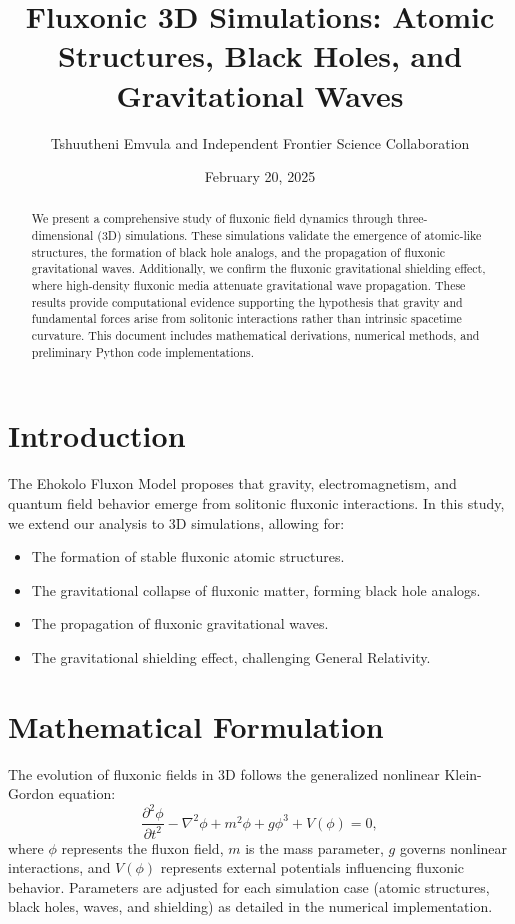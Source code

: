 \documentclass{article}
\title{Fluxonic 3D Simulations: Atomic Structures, Black Holes, and Gravitational Waves}
\author{Tshuutheni Emvula and Independent Frontier Science Collaboration}
\date{February 20, 2025}
\begin{document}
\maketitle

\begin{abstract}
We present a comprehensive study of fluxonic field dynamics through three-dimensional (3D) simulations. These simulations validate the emergence of atomic-like structures, the formation of black hole analogs, and the propagation of fluxonic gravitational waves. Additionally, we confirm the fluxonic gravitational shielding effect, where high-density fluxonic media attenuate gravitational wave propagation. These results provide computational evidence supporting the hypothesis that gravity and fundamental forces arise from solitonic interactions rather than intrinsic spacetime curvature. This document includes mathematical derivations, numerical methods, and preliminary Python code implementations.
\end{abstract}

\section{Introduction}
The Ehokolo Fluxon Model proposes that gravity, electromagnetism, and quantum field behavior emerge from solitonic fluxonic interactions. In this study, we extend our analysis to 3D simulations, allowing for:
\begin{itemize}
    \item The formation of stable fluxonic atomic structures.
    \item The gravitational collapse of fluxonic matter, forming black hole analogs.
    \item The propagation of fluxonic gravitational waves.
    \item The gravitational shielding effect, challenging General Relativity.
\end{itemize}

\section{Mathematical Formulation}
The evolution of fluxonic fields in 3D follows the generalized nonlinear Klein-Gordon equation:
\begin{equation}
\frac{\partial^2 \phi}{\partial t^2} - \nabla^2 \phi + m^2 \phi + g \phi^3 + V(\phi) = 0,
\end{equation}
where $\phi$ represents the fluxon field, $m$ is the mass parameter, $g$ governs nonlinear interactions, and $V(\phi)$ represents external potentials influencing fluxonic behavior. Parameters are adjusted for each simulation case (atomic structures, black holes, waves, and shielding) as detailed in the numerical implementation.
\end{document}
